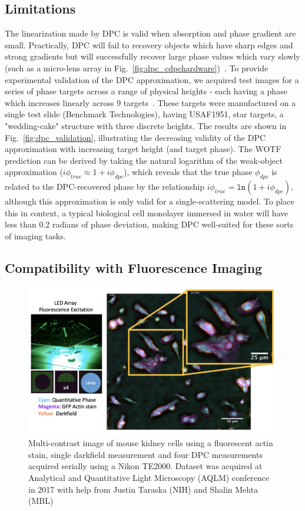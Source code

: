 \subsection{Limitations}
The linearization made by DPC is valid when absorption and phase gradient are small. Practically, DPC will fail to recovery objects which have sharp edges and strong gradients but will successfully recover large phase values which vary slowly (such as a micro-lens array in Fig.~\ref{fig:dpc_cdpchardware})~\cite{Claus2015, chen2018quantitative}. To provide experimental validation of the DPC approximation, we acquired test images for a series of phase targets across a range of physical heights - each having a phase which increases linearly across 9 targets~\cite{phillipstechnical}. These targets were manufactured on a single test slide (Benchmark Technologies), having USAF1951, star targets, a "wedding-cake" structure with three discrete heights. The results are shown in Fig.~\ref{fig:dpc_validation}, illustrating the decreasing validity of the DPC approximation with increasing target height (and target phase). The WOTF prediction can be derived by taking the natural logarithm of the weak-object approximation ($i\phi_{true} \approx 1 + i\phi_{dpc}$), which reveals that the true phase $\phi_{dpc}$ is related to the DPC-recovered phase by the relationship $i\phi_{true}= \texttt{ln}(1 + i\phi_{dpc})$, although this approximation is only valid for a single-scattering model. To place this in context, a typical biological cell monolayer immersed in water will have less than 0.2 radians of phase deviation, making DPC well-suited for these sorts of imaging tasks.

\subsection{Compatibility with Fluorescence Imaging}

\begin{figure}[tbh]
\centering
\includegraphics[width=\textwidth]{figures/fig_fabrication_dome_multi.png}
\caption{\label{fig:dpc_multi} Multi-contrast image of mouse kidney cells using a fluorescent actin stain, single darkfield measurement and four DPC measurements acquired serially using a Nikon TE2000. Dataset was acquired at Analytical and Quantitative Light Microscopy (AQLM) conference in 2017 with help from Justin Taraska (NIH) and Shalin Mehta (MBL)}
\end{figure}

